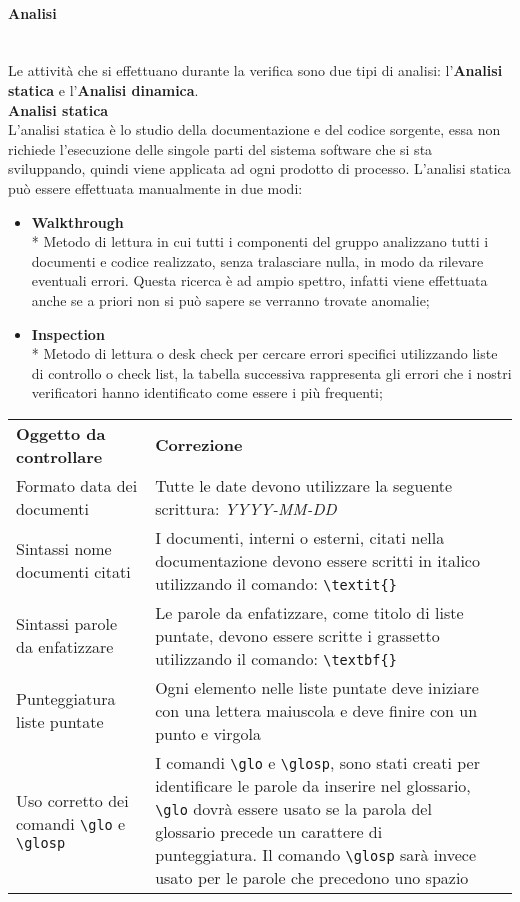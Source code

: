 \paragraph{Analisi}\mbox{}\\ [1mm]
Le attività che si effettuano durante la verifica sono due tipi di analisi: l'\textbf{Analisi statica} e l'\textbf{Analisi dinamica}. \\[2mm]
\textbf{Analisi statica}\mbox{}\\ [1mm]
L'analisi statica è lo studio della documentazione e del codice sorgente, essa non richiede l'esecuzione delle singole parti del sistema software che si sta sviluppando, quindi viene applicata ad ogni prodotto di processo. L'analisi statica può essere effettuata manualmente in due modi:
\begin{itemize}
	\item \textbf{Walkthrough} \\*
	Metodo di lettura in cui tutti i componenti del gruppo analizzano tutti i documenti e codice realizzato, senza tralasciare nulla, in modo da rilevare eventuali errori. Questa ricerca è ad ampio spettro, infatti viene effettuata anche se a priori non si può sapere se verranno trovate anomalie;
	\item \textbf{Inspection} \\*
	Metodo di lettura o desk check per cercare errori specifici utilizzando liste di controllo o check list, la tabella successiva rappresenta gli errori che i nostri verificatori hanno identificato come essere i più frequenti;
\end{itemize}
\begin{longtable} {
		>{\centering}p{55mm} 
		>{\centering}p{55mm}
		>{}p{0mm}}
	\rowcolor{gray!50}
	\textbf{Oggetto da controllare} & \textbf{Correzione} & \TBstrut \\[2mm]
	Formato data dei documenti & Tutte le date devono utilizzare la seguente scrittura: \textit{YYYY-MM-DD}  &  \TBstrut \\[2mm]
	Sintassi nome documenti citati & I documenti, interni o esterni, citati nella documentazione devono essere scritti in italico utilizzando il comando: \verb|\textit{}|  &  \TBstrut \\[2mm]
	Sintassi parole da enfatizzare & Le parole da enfatizzare, come titolo di liste puntate, devono essere scritte i grassetto utilizzando il comando: \verb|\textbf{}|  &  \TBstrut \\[2mm]
	Punteggiatura liste puntate & Ogni elemento nelle liste puntate deve iniziare con una lettera maiuscola e deve finire con un punto e virgola &  \TBstrut \\[2mm]
	Uso corretto dei comandi \verb|\glo| e \verb|\glosp| & I comandi \verb|\glo| e \verb|\glosp|, sono stati creati per identificare le parole da inserire nel glossario, \verb|\glo| dovrà essere usato se la parola del glossario precede un carattere di punteggiatura. Il comando \verb|\glosp| sarà invece usato per le parole che precedono uno spazio &  \TBstrut \\	[2mm]
\end{longtable}

